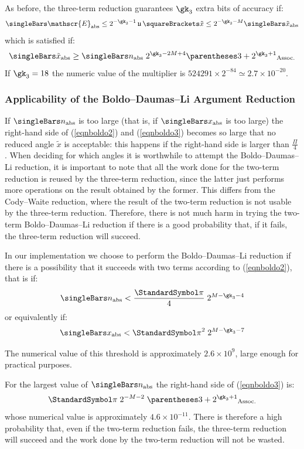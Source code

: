 \documentclass[10pt, a4paper, twoside]{basestyle}
\DeclareMathOperator{\ULP}{\mathfrak u}
\newcommand{\red}[1]{\tilde{#1}}
\begin{document}
As before, the three-term reduction guarantees $\gk_3$ extra bits of accuracy if:
\[
\abs{\mathscr{E}} \leq 2^{-\gk_3 - 1} \ULP\of{\red x} \leq 2^{-\gk_3 - M} \abs{\red x}
\]
which is satisfied if:
\begin{equation}
\abs{\red x} \geq \abs{n} \; 2^{\gk_3 - 2 M + 4} \pa{3 + 2^{\gk_3 + 1}}
\label{eqnboldo3}
\end{equation}
If $\gk_3 = 18$ the numeric value of the multiplier is $524291 \times 2^{-84} \simeq 2.7 \times 10^{-20}$.

\subsubsection*{Applicability of the Boldo--Daumas--Li Argument Reduction}

If $\abs{n}$ is too large (that is, if $\abs{x}$ is too large) the right-hand side of (\ref{eqnboldo2}) and (\ref{eqnboldo3}) becomes so large that no reduced angle $\red x$ is acceptable: this happens if the right-hand side is larger than $\frac{\Pi}{4}$.  When deciding for which angles it is worthwhile to attempt the Boldo--Daumas--Li reduction, it is important to note that all the work done for the two-term reduction is reused by the three-term reduction, since the latter just performs more operations on the result obtained by the former.  This differs from the Cody--Waite reduction, where the result of the two-term reduction is not usable by the three-term reduction.  Therefore, there is not much harm in trying the two-term Boldo--Daumas--Li reduction if there is a good probability that, if it fails, the three-term reduction will succeed.

In our implementation we choose to perform the Boldo--Daumas--Li reduction if there is a possibility that it succeeds with two terms according to (\ref{eqnboldo2}), that is if:
\[
\abs{n} < \frac{\Pi}{4} \; 2^{M - \gk_3 - 4}
\]
or equivalently if:
\[
\abs{x} < \Pi^2 \; 2^{M - \gk_3 - 7}
\]

The numerical value of this threshold is approximately $2.6 \times 10^9$, large enough for practical purposes.

For the largest value of $\abs{n}$ the right-hand side of (\ref{eqnboldo3}) is:
\[
\Pi \; 2^{-M - 2} \; \pa{3 + 2^{\gk_3 + 1}}
\]
whose numerical value is approximately $4.6 \times 10^{-11}$.  There is therefore a high probability that, even if the two-term reduction fails, the three-term reduction will succeed and the work done by the two-term reduction will not be wasted.
\end{document}
